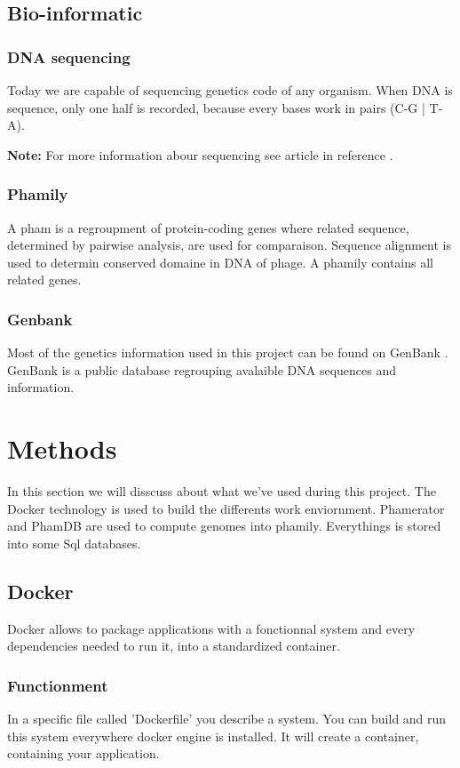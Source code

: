 \documentclass[a4paper,11pt]{report}
\begin{document}
\section{Bio-informatic}
\subsection{DNA sequencing}
Today we are capable of sequencing genetics code of any organism. When DNA is sequence, only one half is recorded, because every bases work in pairs (C-G | T-A).

\textbf{Note:} For more information abour sequencing see article in reference \cite{ref9}.

\subsection{Phamily}
A pham is a regroupment of protein-coding genes where related sequence, determined by pairwise analysis, are used for comparaison. Sequence alignment is used to determin conserved domaine in DNA of phage. A phamily contains all related genes.

\subsection{Genbank}
Most of the genetics information used in this project can be found on GenBank \cite{ref10}. GenBank is a public database regrouping avalaible DNA sequences and information.


\chapter{Methods}
In this section we will disscuss about what we've used during this project. The Docker technology is used to build the differents work enviornment. Phamerator and PhamDB are used to compute genomes into phamily. Everythings is stored into some Sql databases.

\section{Docker}
Docker allows to package applications with a fonctionnal system and every dependencies needed to run it, into a standardized container. \cite{ref3}

\subsection{Functionment}
In a specific file called 'Dockerfile' you describe a system. You can build and run this system everywhere docker engine is installed. It will create a container, containing your application.
\end{document}
